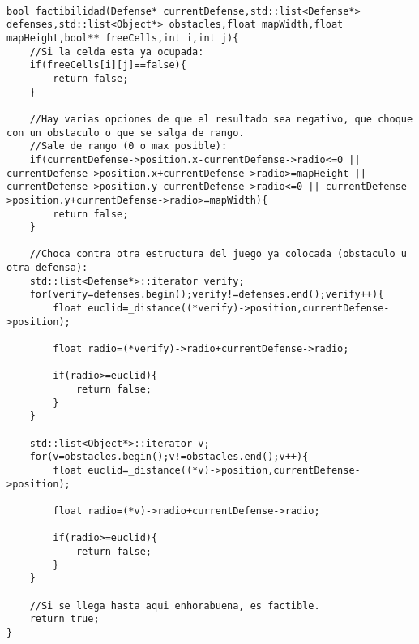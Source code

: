 \begin{lstlisting}

bool factibilidad(Defense* currentDefense,std::list<Defense*> defenses,std::list<Object*> obstacles,float mapWidth,float mapHeight,bool** freeCells,int i,int j){
	//Si la celda esta ya ocupada:
	if(freeCells[i][j]==false){
		return false;
	}

	//Hay varias opciones de que el resultado sea negativo, que choque con un obstaculo o que se salga de rango.
	//Sale de rango (0 o max posible):
	if(currentDefense->position.x-currentDefense->radio<=0 || currentDefense->position.x+currentDefense->radio>=mapHeight || currentDefense->position.y-currentDefense->radio<=0 || currentDefense->position.y+currentDefense->radio>=mapWidth){
		return false;
	}

	//Choca contra otra estructura del juego ya colocada (obstaculo u otra defensa):
	std::list<Defense*>::iterator verify;
	for(verify=defenses.begin();verify!=defenses.end();verify++){
		float euclid=_distance((*verify)->position,currentDefense->position);

		float radio=(*verify)->radio+currentDefense->radio;

		if(radio>=euclid){
			return false;
		}
	}

	std::list<Object*>::iterator v;
	for(v=obstacles.begin();v!=obstacles.end();v++){
		float euclid=_distance((*v)->position,currentDefense->position);

		float radio=(*v)->radio+currentDefense->radio;

		if(radio>=euclid){
			return false;
		}
	}
	
	//Si se llega hasta aqui enhorabuena, es factible.
	return true;
}

\end{lstlisting}